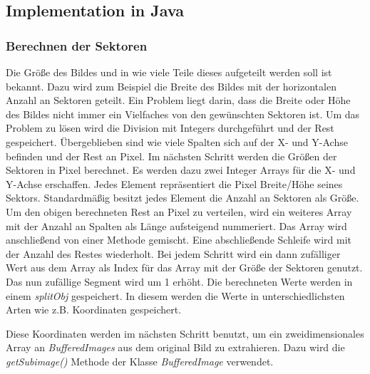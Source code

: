 \subsection{Implementation in Java}
\subsubsection{Berechnen der Sektoren}\label{BerechnenSektoren}
Die Größe des Bildes und in wie viele Teile dieses aufgeteilt werden soll ist bekannt. Dazu wird zum Beispiel die Breite des Bildes mit der horizontalen Anzahl an Sektoren geteilt. Ein Problem liegt darin, dass die Breite oder Höhe des Bildes nicht immer ein Vielfaches von den gewünschten Sektoren ist. Um das Problem zu lösen wird die Division mit Integers durchgeführt und der Rest gespeichert. Übergeblieben sind wie viele Spalten sich auf der X- und Y-Achse befinden und der Rest an Pixel. Im nächsten Schritt werden die Größen der Sektoren in Pixel berechnet. Es werden dazu zwei Integer Arrays für die X- und Y-Achse erschaffen. Jedes Element repräsentiert die Pixel Breite/Höhe seines Sektors. Standardmäßig besitzt jedes Element die Anzahl an Sektoren als Größe. Um den obigen berechneten Rest an Pixel zu verteilen, wird ein weiteres Array mit der Anzahl an Spalten als Länge aufsteigend nummeriert. Das Array wird anschließend von einer Methode gemischt. Eine abschließende Schleife wird mit der Anzahl des Restes wiederholt. Bei jedem Schritt wird ein dann zufälliger Wert aus dem Array als Index für das Array mit der Größe der Sektoren genutzt. Das nun zufällige Segment wird um 1 erhöht. Die berechneten Werte werden in einem \textit{splitObj} gespeichert. In diesem werden die Werte in unterschiedlichsten Arten wie z.B. Koordinaten gespeichert. 

Diese Koordinaten werden im nächsten Schritt benutzt, um ein zweidimensionales Array an \textit{BufferedImages} aus dem original Bild zu extrahieren. Dazu wird die \textit{getSubimage()} Methode der Klasse \textit{BufferedImage} verwendet.

